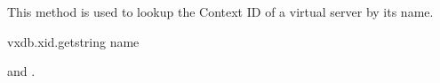 This method is used to lookup the Context ID of a virtual server by its name.

\begin{rpcsynopsis}{vxdb.xid.get}{string name}
\end{rpcsynopsis}

\begin{rpcaccess}
 and \rpcnoownerchecks.
\end{rpcaccess}


\rpcnoerrors
